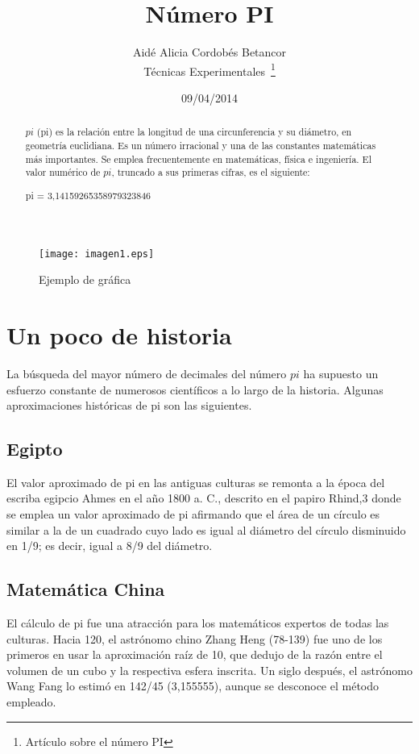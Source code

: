\documentclass[a4paper,12pt]{article}
\begin{document}
\title{Número PI}
\author{Aidé Alicia Cordobés Betancor \\
       Técnicas Experimentales~\footnote{Artículo sobre el número PI}
       }
\date{09/04/2014}
\maketitle

\begin{abstract}
$pi$ (pi) es la relación entre la longitud
de una circunferencia y su diámetro,
en geometría euclidiana. Es un número
irracional y una de las constantes matemáticas
más importantes. Se emplea frecuentemente en
matemáticas, física e ingeniería.
El valor numérico de $pi$, truncado a sus primeras
cifras, es el siguiente:
    
    pi = 3,14159265358979323846 

    \end{abstract}
\begin{figure}[t]
\texttt{[image: imagen1.eps]}
\caption{Ejemplo de gráfica}
\label{fig1}
\end{figure}
\section{Un poco de historia}
La búsqueda del mayor número de decimales
del número $pi$ ha supuesto un esfuerzo constante
de numerosos científicos a lo largo de la historia.
Algunas aproximaciones históricas de pi son las
siguientes.
\subsection{Egipto}
El valor aproximado de pi en las antiguas
culturas se remonta a la época del escriba
egipcio Ahmes en el año 1800 a. C.,
descrito en el papiro Rhind,3 donde se emplea
un valor aproximado de pi afirmando que el área
de un círculo es similar a la de un cuadrado
cuyo lado es igual al diámetro del círculo
disminuido en 1/9; es decir, igual a 8/9 del
diámetro.
\subsection{Matemática China}
El cálculo de pi fue una atracción para los
matemáticos expertos de todas las culturas.
Hacia 120, el astrónomo chino Zhang Heng (78-139)
fue uno de los primeros en usar la aproximación 
raíz de 10, que dedujo de la razón entre el volumen
de un cubo y la respectiva esfera inscrita.
Un siglo después, el astrónomo Wang Fang lo
estimó en 142/45 (3,155555), aunque se desconoce
el método empleado.
\end{document}
